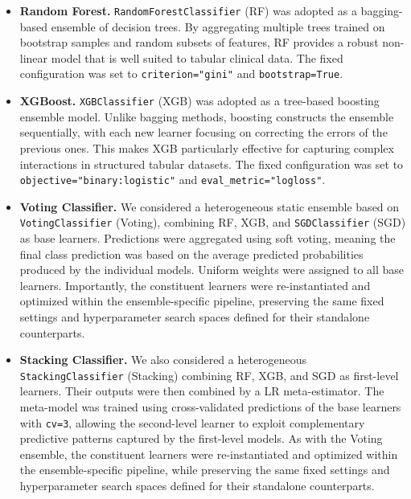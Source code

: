 \documentclass[conference]{IEEEtran}
\begin{document}
\begin{itemize}

\item \textbf{Random Forest.} \texttt{RandomForestClassifier} (RF) was adopted as a bagging-based ensemble of decision trees. By aggregating multiple trees trained on bootstrap samples and random subsets of features, RF provides a robust non-linear model that is well suited to tabular clinical data. The fixed configuration was set to \texttt{criterion="gini"} and \texttt{bootstrap=True}.

\item \textbf{XGBoost.} \texttt{XGBClassifier} (XGB) was adopted as a tree-based boosting ensemble model. Unlike bagging methods, boosting constructs the ensemble sequentially, with each new learner focusing on correcting the errors of the previous ones. This makes XGB particularly effective for capturing complex interactions in structured tabular datasets. The fixed configuration was set to \texttt{objective="binary:logistic"} and \texttt{eval\_metric="logloss"}.

\item \textbf{Voting Classifier.}  
We considered a heterogeneous static ensemble based on \texttt{VotingClassifier} (Voting), combining RF, XGB, and \texttt{SGDClassifier} (SGD) as base learners. Predictions were aggregated using soft voting, meaning the final class prediction was based on the average predicted probabilities produced by the individual models. Uniform weights were assigned to all base learners. Importantly, the constituent learners were re-instantiated and optimized within the ensemble-specific pipeline, preserving the same fixed settings and hyperparameter search spaces defined for their standalone counterparts.

\item \textbf{Stacking Classifier.}  
We also considered a heterogeneous \texttt{StackingClassifier} (Stacking) combining RF, XGB, and SGD as first-level learners. Their outputs were then combined by a LR meta-estimator. The meta-model was trained using cross-validated predictions of the base learners with \texttt{cv=3}, allowing the second-level learner to exploit complementary predictive patterns captured by the first-level models. As with the Voting ensemble, the constituent learners were re-instantiated and optimized within the ensemble-specific pipeline, while preserving the same fixed settings and hyperparameter search spaces defined for their standalone counterparts.
\end{itemize}
\end{document}
